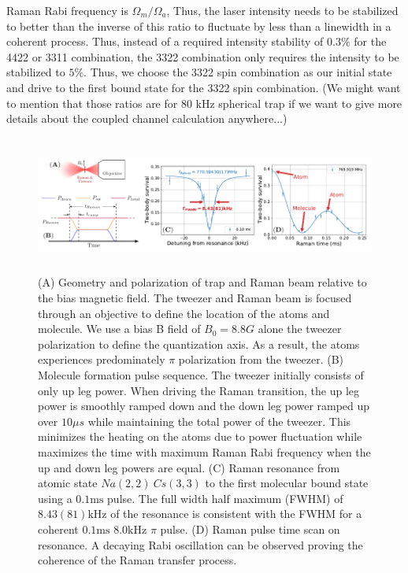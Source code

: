 \documentclass[aps,prl,twocolumn,groupedaddress]{revtex4-1}
\begin{document}
Raman Rabi frequency is $ \Omega_m / \Omega_a $, Thus, the laser intensity needs to be stabilized to better than the inverse of this ratio to fluctuate by less than a linewidth in a coherent process. Thus, instead of a required intensity stability of $0.3 \% $ for the 4422 or 3311 combination, the 3322 combination only requires the intensity to be stabilized to $ 5\% $.  Thus, we choose the 3322 spin combination as our initial state and drive to the first bound state for the 3322 spin combination. (We might want to mention that those ratios are for 80 kHz spherical trap if we want to give more details about the coupled channel calculation anywhere...)

\begin{figure}[ht!]
  \includegraphics[height=4.5cm]{fig2.pdf}
  \caption{
    (A) Geometry and polarization of trap and Raman beam relative to the bias magnetic field.
    The tweezer and Raman beam is focused through an objective to define the location of the
    atoms and molecule.
    We use a bias B field of $B_0=8.8 G$ alone the tweezer polarization
    to define the quantization axis.
    As a result, the atoms experiences predominately $\pi$ polarization from the tweezer.
    (B) Molecule formation pulse sequence. The tweezer initially consists of only up leg power.
    When driving the Raman transition, the up leg power is smoothly ramped down and
    the down leg power ramped up over $10\mu s$ while maintaining the total power of the tweezer.
    This minimizes the heating on the atoms due to power fluctuation while maximizes the time
    with maximum Raman Rabi frequency when the up and down leg powers are equal.
    (C) Raman resonance from atomic state $Na(2,2)\ Cs(3,3)$ to the first molecular bound state
    using a $0.1\mathrm{ms}$ pulse.
    The full width half maximum (FWHM) of $8.43(81) \mathrm{kHz}$ of the resonance
    is consistent with the FWHM for a coherent $0.1\mathrm{ms}$ $8.0 \mathrm{kHz}$ $\pi$ pulse.
    (D) Raman pulse time scan on resonance. A decaying Rabi oscillation can be observed
    proving the coherence of the Raman transfer process.
    \label{f-raman}}
\end{figure}
\end{document}
